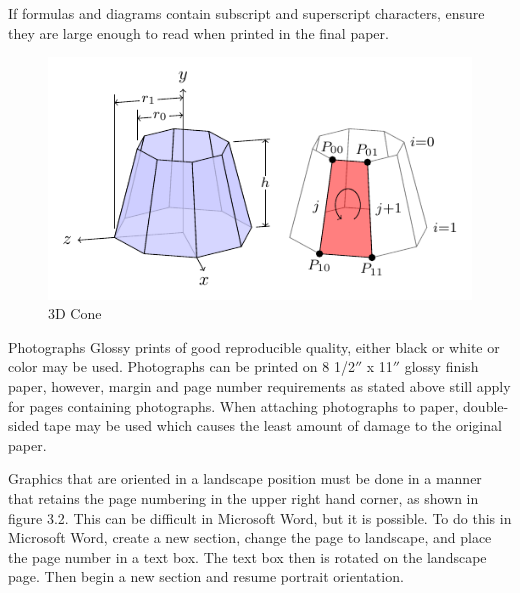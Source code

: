 If formulas and diagrams contain subscript and superscript characters, ensure they are large enough to read when printed in the final paper. 

\begin{figure}[htp]
\centering
\includegraphics{casestudy/figures/3d-cone.pdf}
\caption{3D Cone}\label{fig:3d-cone}
\end{figure}

Photographs
Glossy prints of good reproducible quality, either black or white or color may be used. Photographs can be printed on 8 1/2$''$ x 11$''$ glossy finish paper, however, margin and page number requirements as stated above still apply for pages containing photographs. When attaching photographs to paper, double-sided tape may be used which causes the least amount of damage to the original paper. 

Graphics that are oriented in a landscape position must be done in a manner that retains the page numbering in the upper right hand corner, as shown in figure 3.2.  This can be difficult in Microsoft Word, but it is possible.  To do this in Microsoft Word, create a new section, change the page to landscape, and place the page number in a text box.  The text box then is rotated on the landscape page.    Then begin a new section and resume portrait orientation.

